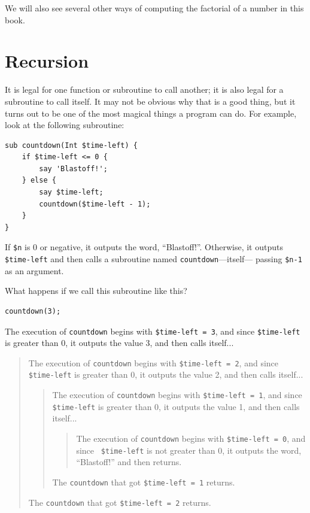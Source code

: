 We will also see several other ways of computing the factorial 
of a number in this book.

\section{Recursion}
\label{recursion}

It is legal for one function or subroutine to call another;
it is also legal for a subroutine to call itself.  It may not 
be obvious why that is a good thing, but it turns out to be 
one of the most magical things a program can do. 
For example, look at the following subroutine:

\begin{verbatim}
sub countdown(Int $time-left) {
    if $time-left <= 0 {
        say 'Blastoff!';
    } else {
        say $time-left;
        countdown($time-left - 1);
    }
}
\end{verbatim}
%
If {\tt \$n} is 0 or negative, it outputs the word, 
``Blastoff!''. Otherwise, it outputs {\tt \$time-left} 
and then calls a subroutine named {\tt countdown}---itself---
passing {\tt \$n-1} as an argument.

What happens if we call this subroutine like this?

\begin{verbatim}
countdown(3);
\end{verbatim}
%
The execution of {\tt countdown} begins with {\tt \$time-left 
= 3}, and since {\tt \$time-left} is greater than 0, it 
outputs the value 3, and then calls itself...

\begin{quote}
The execution of {\tt countdown} begins with {\tt \$time-left = 2}, and since
{\tt \$time-left} is greater than 0, it outputs the value 2, and then calls itself...

\begin{quote}
The execution of {\tt countdown} begins with {\tt \$time-left = 1}, and since
{\tt \$time-left} is greater than 0, it outputs the value 1, and then calls itself...

\begin{quote}
The execution of {\tt countdown} begins with {\tt \$time-left = 0}, and since {\tt
\$time-left} is not greater than 0, it outputs the word, ``Blastoff!'' and then
returns.
\end{quote}

The {\tt countdown} that got {\tt \$time-left = 1} returns.
\end{quote}

The {\tt countdown} that got {\tt \$time-left = 2} returns.
\end{quote}


